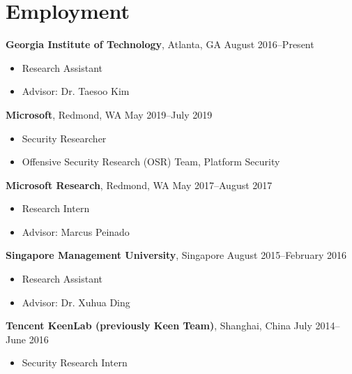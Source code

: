 \section*{Employment}

\begin{description}
\item {\bf Georgia Institute of Technology}, Atlanta, GA
\dotfill August 2016--Present
  \begin{itemize}
  \item Research Assistant
  \item Advisor: Dr. Taesoo Kim
  \end{itemize}

 \item {\bf Microsoft}, Redmond, WA \dotfill May 2019--July 2019
  \begin{itemize}
  \item Security Researcher
  \item Offensive Security Research (OSR) Team, Platform Security
  \end{itemize}
 
\item {\bf Microsoft Research}, Redmond, WA \dotfill May 2017--August 2017
  \begin{itemize}
  \item Research Intern
  \item Advisor: Marcus Peinado
  \end{itemize}

\item {\bf Singapore Management University}, Singapore \dotfill August 2015--February 2016
  \begin{itemize}
  \item Research Assistant
  \item Advisor: Dr. Xuhua Ding
  \end{itemize}

\item {\bf Tencent KeenLab (previously Keen Team)}, Shanghai, China \dotfill July 2014--June 2016
	\begin{itemize}
	\item Security Research Intern
	\end{itemize}
\end{description}
